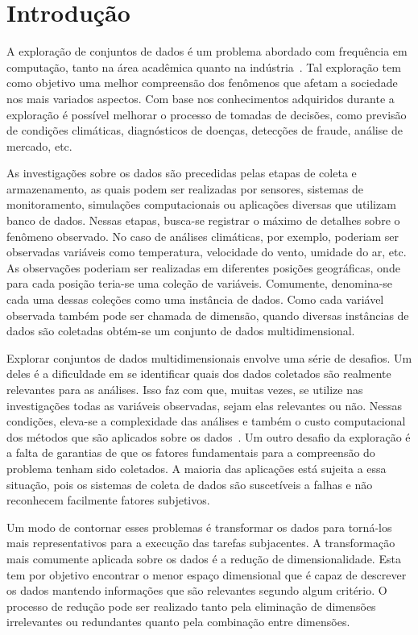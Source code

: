 \section{Introdução}

A exploração de conjuntos de dados é um problema abordado
com frequência em computação, tanto na área acadêmica quanto
na indústria~\cite{Ngai2009,Harding2006}. Tal exploração tem
como objetivo uma melhor compreensão dos fenômenos que
afetam a sociedade nos mais variados aspectos. Com base nos
conhecimentos adquiridos durante a exploração é possível 
melhorar o processo de tomadas de decisões, como
previsão de condições climáticas, diagnósticos de doenças,
detecções de fraude, análise de mercado, etc.

As investigações sobre os dados são precedidas pelas etapas
de coleta e armazenamento, as quais podem ser
realizadas por sensores, sistemas de monitoramento,
simulações computacionais ou aplicações diversas que
utilizam banco de dados. Nessas etapas, busca-se registrar o
máximo de detalhes sobre o fenômeno observado. No caso de
análises climáticas, por exemplo, poderiam ser observadas
variáveis como temperatura, velocidade do vento, umidade do
ar, etc. As observações poderiam ser realizadas em
diferentes posições geográficas, onde para cada posição
teria-se uma coleção de variáveis. Comumente, denomina-se
cada uma dessas coleções como uma instância de dados.
Como cada variável observada também pode ser
chamada de dimensão, quando diversas instâncias de dados são
coletadas obtém-se um conjunto de dados multidimensional. 

Explorar conjuntos de dados multidimensionais envolve uma
série de desafios. Um deles é a dificuldade em se
identificar quais dos dados coletados são realmente
relevantes para as análises. Isso faz com que, muitas vezes,
se utilize nas investigações todas as variáveis observadas,
sejam elas relevantes ou não. Nessas condições, eleva-se a
complexidade das análises e também o custo computacional dos
métodos que são aplicados sobre os dados~\cite{Beyer1999}.
Um outro desafio da exploração é a falta de
garantias de que os fatores fundamentais para a compreensão
do problema tenham sido coletados. A maioria das aplicações
está sujeita a essa situação, pois os sistemas de coleta de
dados são suscetíveis a falhas e não reconhecem facilmente
fatores subjetivos. 

Um modo de contornar esses problemas é transformar os dados
para torná-los mais representativos para a execução das
tarefas subjacentes. A transformação mais comumente aplicada
sobre os dados é a redução de dimensionalidade. Esta tem
por objetivo encontrar o menor espaço dimensional que é
capaz de descrever os dados mantendo informações que são
relevantes segundo algum critério. O processo de redução
pode ser realizado tanto pela eliminação de dimensões
irrelevantes ou redundantes quanto pela combinação entre
dimensões. 

